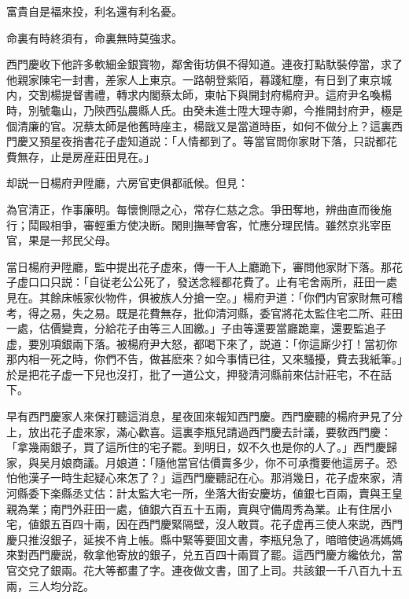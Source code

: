 \begin{myquote}
富貴自是福來投，利名還有利名憂。

命裏有時終須有，命裏無時莫強求。
\end{myquote}

西門慶收下他許多軟細金銀寳物，鄰舍街坊俱不得知道。連夜打點馱裝停當，求了他親家陳宅一封書，差家人上東京。一路朝登紫陌，暮踐紅塵，有日到了東京城内，交割楊提督書禮，轉求内閣蔡太師，柬帖下與開封府楊府尹。這府尹名喚楊時，別號龜山，乃陝西弘農縣人氏。由癸未進士陞大理寺卿，今推開封府尹，極是個清廉的官。况蔡太師是他舊時座主，楊戩又是當道時臣，如何不做分上？這裏西門慶又預星夜捎書花子虚知道説：「人情都到了。等當官問你家財下落，只説都花費無存，止是房産莊田見在。」

却説一日楊府尹陞廳，六房官吏俱都祇候。但見：

\begin{myquote}
為官清正，作事廉明。每懷惻隠之心，常存仁慈之念。爭田奪地，辨曲直而後施行；鬦毆相爭，審輕重方使决断。閑則撫琴會客，忙應分理民情。雖然京兆宰臣官，果是一邦民父母。
\end{myquote}

當日楊府尹陞廳，監中提出花子虚來，傳一干人上廳跪下，審問他家財下落。那花子虚口口只説：「自従老公公死了，發送念經都花費了。止有宅舍兩所，莊田一處見在。其餘床帳家伙物件，俱被族人分搶一空。」楊府尹道：「你們内官家財無可稽考，得之易，失之易。既是花費無存，批仰清河縣，委官將花太監住宅二所、莊田一處，估價變賣，分給花子由等三人囬繳。」子由等還要當廳跪稟，還要監追子虚，要別項銀兩下落。被楊府尹大怒，都喝下來了，説道：「你這廝少打！當初你那内相一死之時，你們不告，做甚麽來？如今事情已往，又來騷擾，費去我紙筆。」於是把花子虚一下兒也沒打，批了一道公文，押發清河縣前來估計莊宅，不在話下。

早有西門慶家人來保打聽這消息，星夜囬來報知西門慶。西門慶聽的楊府尹見了分上，放出花子虚來家，滿心歡喜。這裏李瓶兒請過西門慶去計議，要敎西門慶：「拿幾兩銀子，買了這所住的宅子罷。到明日，奴不久也是你的人了。」西門慶歸家，與吴月娘商議。月娘道：「隨他當官估價賣多少，你不可承攬要他這房子。恐怕他漢子一時生起疑心來怎了？」這西門慶聽記在心。那消幾日，花子虚來家，清河縣委下楽縣丞丈估：計太監大宅一所，坐落大街安慶坊，値銀七百兩，賣與王皇親為業；南門外莊田一處，値銀六百五十五兩，賣與守備周秀為業。止有住居小宅，値銀五百四十兩，因在西門慶緊隔壁，沒人敢買。花子虚再三使人來説，西門慶只推沒銀子，延挨不肯上帳。縣中緊等要囬文書，李瓶兒急了，暗暗使過馮媽媽來對西門慶説，敎拿他寄放的銀子，兑五百四十兩買了罷。這西門慶方纔依允，當官交兌了銀兩。花大等都畫了字。連夜做文書，囬了上司。共該銀一千八百九十五兩，三人均分訖。

